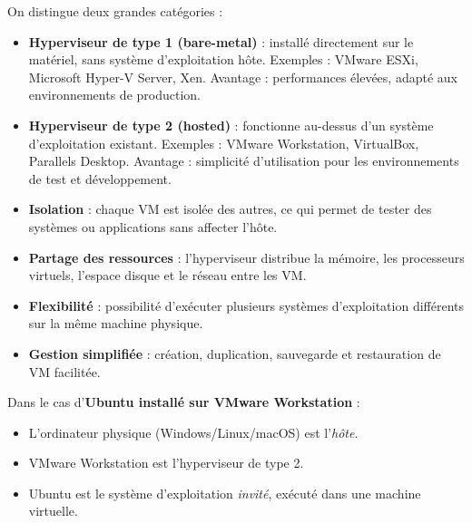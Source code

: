 \documentclass[11pt,a4paper]{article}
\begin{document}
\begin{tcolorbox}[title={Types d’hyperviseurs}]
On distingue deux grandes catégories :
\begin{itemize}
  \item \textbf{Hyperviseur de type 1 (bare-metal)} : installé directement sur le matériel, sans système d’exploitation hôte.  
  Exemples : VMware ESXi, Microsoft Hyper-V Server, Xen.  
  Avantage : performances élevées, adapté aux environnements de production.
  
  \item \textbf{Hyperviseur de type 2 (hosted)} : fonctionne au-dessus d’un système d’exploitation existant.  
  Exemples : VMware Workstation, VirtualBox, Parallels Desktop.  
  Avantage : simplicité d’utilisation pour les environnements de test et développement.
\end{itemize}
\end{tcolorbox}

\begin{tcolorbox}[title={Rôle principal}]
\begin{itemize}
  \item \textbf{Isolation} : chaque VM est isolée des autres, ce qui permet de tester des systèmes ou applications sans affecter l’hôte.  
  \item \textbf{Partage des ressources} : l’hyperviseur distribue la mémoire, les processeurs virtuels, l’espace disque et le réseau entre les VM.  
  \item \textbf{Flexibilité} : possibilité d’exécuter plusieurs systèmes d’exploitation différents sur la même machine physique.  
  \item \textbf{Gestion simplifiée} : création, duplication, sauvegarde et restauration de VM facilitée.
\end{itemize}
\end{tcolorbox}

\begin{tcolorbox}[title={Exemple concret}]
Dans le cas d’\textbf{Ubuntu installé sur VMware Workstation} :  
\begin{itemize}
  \item L’ordinateur physique (Windows/Linux/macOS) est l’\emph{hôte}.  
  \item VMware Workstation est l’hyperviseur de type 2.  
  \item Ubuntu est le système d’exploitation \emph{invité}, exécuté dans une machine virtuelle.  
\end{itemize}
\end{tcolorbox}
\end{document}

